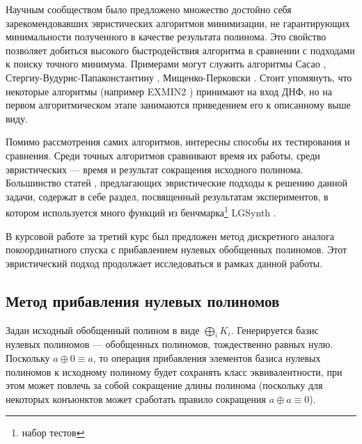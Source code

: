 \documentclass[a4paper,12pt,titlepage,finall]{article}
\begin{document}
Научным сообществом было предложено множество достойно себя зарекомендовавших эвристических алгоритмов минимизации, не гарантирующих минимальности полученного в качестве результата полинома. Это свойство позволяет добиться высокого быстродействия алгоритма в сравнении с подходами к поиску точного минимума. Примерами могут служить алгоритмы Сасао \cite{exmin2}, Стергиу-Вудурис-Папаконстантину \cite{mvesopmin}, Мищенко-Перковски \cite{exorcism4}. Стоит упомянуть, что некоторые алгоритмы (например \textsc{EXMIN2} \cite{exmin2}) принимают на вход ДНФ, но на первом алгоритмическом этапе занимаются приведением его к описанному выше виду.

Помимо рассмотрения самих алгоритмов, интересны способы их тестирования и сравнения. Среди точных алгоритмов сравнивают время их работы, среди эвристических --- время и результат сокращения исходного полинома. Большинство статей \cite{exmin2} \cite{mint} \cite{exorcism4}, предлагающих эвристические подходы к решению данной задачи, содержат в себе раздел, посвященный результатам экспериментов, в котором используется много функций из бенчмарка\footnote{набор тестов} LGSynth \cite{benchmark}.

В курсовой работе за третий курс был предложен метод дискретного аналога покоординатного спуска с прибавлением нулевых обобщенных полиномов. Этот эвристический подход продолжает исследоваться в рамках данной работы.

\subsection{Метод прибавления нулевых полиномов}

Задан исходный обобщенный полином в виде $ \bigoplus\limits_i K_i $. Генерируется базис нулевых полиномов --- обобщенных полиномов, тождественно равных нулю. Поскольку $ a \oplus 0 \equiv a $, то операция прибавления элементов базиса нулевых полиномов к исходному полиному будет сохранять класс эквивалентности, при этом может повлечь за собой сокращение длины полинома (поскольку для некоторых конъюнктов может сработать правило сокращения $ a \oplus a \equiv 0 $).
\end{document}
